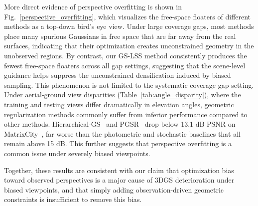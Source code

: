 \documentclass[lettersize,journal]{IEEEtran}
\begin{document}
More direct evidence of perspective overfitting is shown in Fig.~\ref{perspective_overfitting}, which visualizes the free-space floaters of different methods as a top-down bird's eye view.
Under large coverage gaps, most methods place many spurious Gaussians in free space that are far away from the real surfaces, indicating that their optimization creates unconstrained geometry in the unobserved regions.
By contrast, our GS-LSS method consistently produces the fewest free-space floaters across all gap settings, suggesting that the scene-level guidance helps suppress the unconstrained densification induced by biased sampling.
This phenomenon is not limited to the systematic coverage gap setting. Under aerial-ground view disparities (Table~\ref{tab:angle_disparity}), where the training and testing views differ dramatically in elevation angles, geometric regularization methods commonly suffer from inferior performance compared to other methods. Hierarchical-GS~\cite{hierarchical} and PGSR~\cite{pgsr} drop below 13.1 dB PSNR on MatrixCity~\cite{matrixcity}, far worse than the photometric and stochastic baselines that all remain above 15 dB. This further suggests that perspective overfitting is a common issue under severely biased viewpoints.

Together, these results are consistent with our claim that optimization bias toward observed perspectives is a major cause of 3DGS deterioration under biased viewpoints, and that simply adding observation-driven geometric constraints is insufficient to remove this bias.
\end{document}
